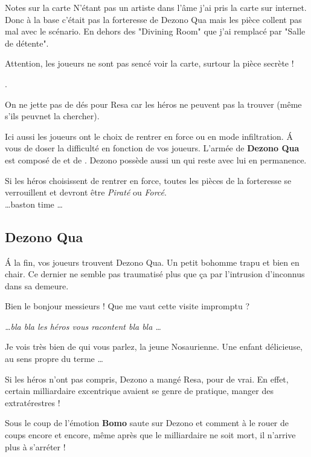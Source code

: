 \documentclass{jdrp}
\begin{document}
	\begin{paperbox}{Notes sur la carte}
	N'étant pas un artiste dans l’âme j’ai pris la carte sur internet. Donc à la base c’était pas la forteresse de Dezono Qua mais les pièce collent pas mal avec le scénario. En dehors des "Divining Room" que j'ai remplacé par "Salle de détente".

	Attention, les joueurs ne sont pas sencé voir la carte, surtour la pièce secrète !

	\cite{sirinkman-deviantart}.
	\end{paperbox}

	On ne jette pas de dés pour Resa car les héros ne peuvent pas la trouver (même s’ils peuvnet la chercher). 

	Ici aussi les joueurs ont le choix de rentrer en force ou en mode infiltration. \'A vous de doser la difficulté en fonction de vos joueurs. L’armée de \textbf{Dezono Qua} est composé de  et de . Dezono possède aussi un  qui reste avec lui en permanence.

	Si les héros choisissent de rentrer en force, toutes les pièces de la forteresse se verrouillent et devront être \textit{Piraté} ou \textit{Forcé}.\\

	\ldots baston time \ldots \\

	\subsection{Dezono Qua}
	\'A la fin, vos joueurs trouvent Dezono Qua. Un petit bohomme trapu et bien en chair. Ce dernier ne semble pas traumatisé plus que ça par l’intrusion d’inconnus dans sa demeure.

	\begin{quotebox}
    	Bien le bonjour messieurs ! Que me vaut cette visite impromptu ?

    	\textit{\ldots bla bla les héros vous racontent bla bla \ldots}

    	Je vois très bien de qui vous parlez, la jeune Nosaurienne. Une enfant délicieuse, au sens propre du terme \ldots
	\end{quotebox}

	Si les héros n'ont pas compris, Dezono a mangé Resa, pour de vrai. En effet, certain milliardaire excentrique avaient se genre de pratique, manger des extratérestres !

	Sous le coup de l’émotion \textbf{Bomo} saute sur Dezono et comment à le rouer de coups encore et encore, même après que le milliardaire ne soit mort, il n’arrive plus à s’arréter !
\end{document}
